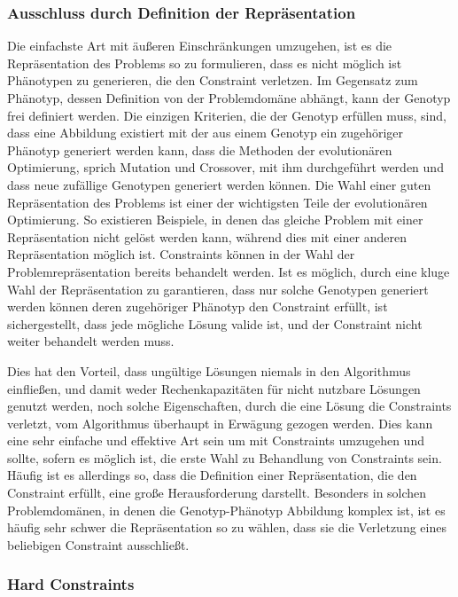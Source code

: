 \subsubsection{Ausschluss durch Definition der Repräsentation}

Die einfachste Art mit äußeren Einschränkungen umzugehen, ist es die Repräsentation des Problems so zu formulieren, dass es nicht möglich ist Phänotypen zu generieren, die den Constraint verletzen.
Im Gegensatz zum Phänotyp, dessen Definition von der Problemdomäne abhängt, kann der Genotyp frei definiert werden.
Die einzigen Kriterien, die der Genotyp erfüllen muss, sind, dass eine Abbildung existiert mit der aus einem Genotyp ein zugehöriger Phänotyp generiert werden kann, dass die Methoden der evolutionären Optimierung, sprich Mutation und Crossover, mit ihm durchgeführt werden und dass neue zufällige Genotypen generiert werden können.
Die Wahl einer guten Repräsentation des Problems ist einer der wichtigsten Teile der evolutionären Optimierung.
So existieren Beispiele, in denen das gleiche Problem mit einer Repräsentation nicht gelöst werden kann, während dies mit einer anderen Repräsentation möglich ist.
Constraints können in der Wahl der Problemrepräsentation bereits behandelt werden.
Ist es möglich, durch eine kluge Wahl der Repräsentation zu garantieren, dass nur solche Genotypen generiert werden können deren zugehöriger Phänotyp den Constraint erfüllt, ist sichergestellt, dass jede mögliche Lösung valide ist, und der Constraint nicht weiter behandelt werden muss.

Dies hat den Vorteil, dass ungültige Lösungen niemals in den Algorithmus einfließen, und damit weder Rechenkapazitäten für nicht nutzbare Lösungen genutzt werden, noch solche Eigenschaften, durch die eine Lösung die Constraints verletzt, vom Algorithmus überhaupt in Erwägung gezogen werden.
Dies kann eine sehr einfache und effektive Art sein um mit Constraints umzugehen und sollte, sofern es möglich ist, die erste Wahl zu Behandlung von Constraints sein.
Häufig ist es allerdings so, dass die Definition einer Repräsentation, die den Constraint erfüllt, eine große Herausforderung darstellt.
Besonders in solchen Problemdomänen, in denen die Genotyp-Phänotyp Abbildung komplex ist, ist es häufig sehr schwer die Repräsentation so zu wählen, dass sie die Verletzung eines beliebigen Constraint ausschließt.

\subsubsection{Hard Constraints}

